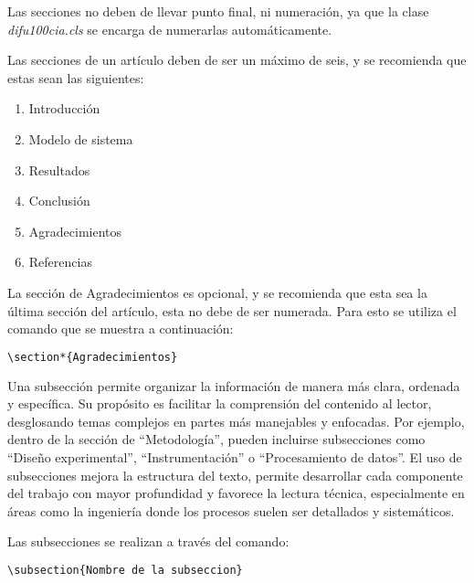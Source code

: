 \documentclass[12pt]{difu100cia} %
\begin{document}
Las secciones no deben de llevar punto final, ni numeración, ya que la clase \textit{difu100cia.cls} se encarga de numerarlas automáticamente.

Las secciones de un artículo deben de ser un máximo de seis, y se recomienda que estas sean las siguientes:

\begin{enumerate}
    \item Introducción
    \item Modelo de sistema
    \item Resultados
    \item Conclusión
    \item Agradecimientos
    \item Referencias
\end{enumerate}

La sección de Agradecimientos es opcional, y se recomienda que esta sea la última sección del artículo, esta no debe de ser numerada. Para esto se utiliza el comando que se muestra a continuación:

\begin{lstlisting}[language=bash]
    \section*{Agradecimientos}
\end{lstlisting}

Una subsección permite organizar la información de manera más clara, ordenada y específica. Su propósito es facilitar la comprensión del contenido al lector, desglosando temas complejos en partes más manejables y enfocadas. Por ejemplo, dentro de la sección de ``Metodología'', pueden incluirse subsecciones como ``Diseño experimental'', ``Instrumentación'' o ``Procesamiento de datos''. El uso de subsecciones mejora la estructura del texto, permite desarrollar cada componente del trabajo con mayor profundidad y favorece la lectura técnica, especialmente en áreas como la ingeniería donde los procesos suelen ser detallados y sistemáticos.

Las subsecciones se realizan a través del comando:

\begin{lstlisting}[language=bash]
    \subsection{Nombre de la subseccion} 
\end{lstlisting}
\end{document}
